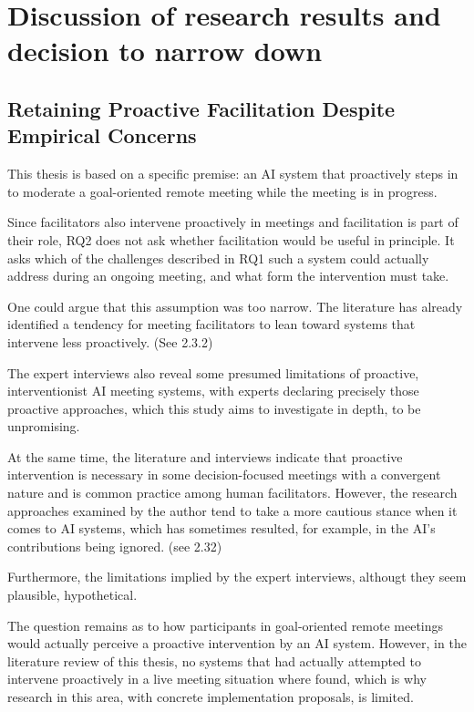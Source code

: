 \section{Discussion of research results and decision to narrow down}
\label{sec:discussion-reduce-scope}

\subsection{Retaining Proactive Facilitation Despite Empirical Concerns}

This thesis is based on a specific premise: an AI system that proactively steps in to moderate a
goal-oriented remote meeting while the meeting is in progress.

Since facilitators also intervene proactively in meetings and facilitation is part of their role, RQ2 does
not ask whether facilitation would be useful in principle. It asks which of the challenges
described in RQ1 such a system could actually address during an ongoing meeting, and what form the
intervention must take.

One could argue that this assumption was too narrow. The literature has already identified a tendency for
meeting facilitators to lean toward systems that intervene less proactively. (See 2.3.2)

The expert interviews also reveal some presumed limitations of proactive, interventionist AI meeting systems,
with experts declaring precisely those proactive approaches, which this study aims to investigate in depth, to
be unpromising.

At the same time, the literature and interviews indicate that proactive intervention is necessary in some
decision-focused meetings with a convergent nature and is common practice among human facilitators. However,
the research approaches examined by the author tend to take a more cautious stance when it comes to AI
systems, which has sometimes resulted, for example, in the AI’s contributions being ignored. (see 2.32)

Furthermore, the limitations implied by the expert interviews, althougt they seem plausible, hypothetical.

The question remains as to how participants in goal-oriented remote meetings would actually perceive a
proactive intervention by an
AI system.
However, in the literature review of this thesis, no systems that had actually attempted to
intervene proactively in a live meeting situation where found, which is why research in this area, with concrete
implementation proposals, is limited.

